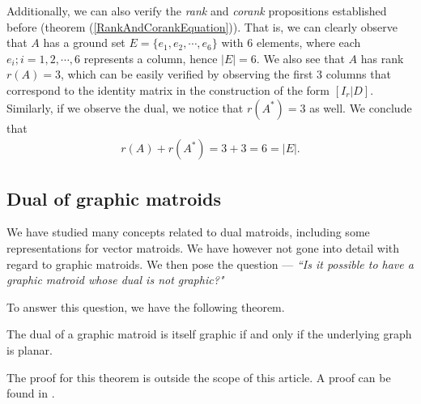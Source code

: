 \begin{exmp}
    Additionally, we can also verify the \textit{rank} and \textit{corank} propositions established before (theorem (\ref{RankAndCorankEquation})). That is, we can clearly observe that $A$ has a ground set $E=\{e_1, e_2, \cdots, e_6\}$ with $6$ elements, where each $e_i; i =1,2, \cdots,6$ represents a column, hence $|E|=6$. We also see that $A$ has rank $r(A)=3$, which can be easily verified by observing the first $3$ columns that correspond to the identity matrix in the construction of the form $[I_r|D]$. Similarly, if we observe the dual, we notice that $r(A^*)=3$ as well. We conclude that 
    \begin{align*}
    r(A)+r(A^*)= 3 + 3 = 6 = |E|.
    \end{align*}
\end{exmp}

%

\subsection{Dual of graphic matroids}
We have studied many concepts related to dual matroids, including some representations for vector matroids. We have however not gone into detail with regard to graphic matroids. We then pose the question --- \textit{``Is it possible to have a graphic matroid whose dual is not graphic?"}

To answer this question, we have the following theorem.

\begin{theorem}
    The dual of a graphic matroid is itself graphic if and only if the underlying graph is planar.
\end{theorem}

The proof for this theorem is outside the scope of this article. A proof can be found in \cite[p. 140, section 5.2]{oxley1}.

